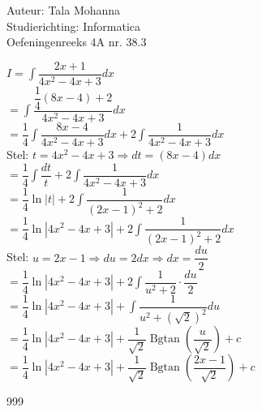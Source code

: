 \documentclass[a4paper]{article}
\newcommand{\adR}{\Rightarrow}
\newcommand{\Lh}{\left(}
\newcommand{\Rh}{\right)}
\newcommand{\intgrl}{\displaystyle\int}
\begin{document}
\noindent \large Auteur: Tala Mohanna \\
\noindent \large Studierichting: Informatica\\
\noindent \large Oefeningenreeks 4A nr. 38.3\\

\medskip

\normalsize

$ I = \intgrl \dfrac{2x+1}{4x^2-4x+3} dx$\\

$= \intgrl \dfrac{\dfrac{1}{4}\Lh 8x-4\Rh +2}{4x^2-4x+3} dx$\\

$= \dfrac{1}{4}\intgrl \dfrac{8x-4}{4x^2-4x+3} dx + 2\intgrl \dfrac{1}{4x^2-4x+3} dx$\\

Stel: $t = 4x^2-4x+3 \adR dt = \Lh 8x-4\Rh dx$\\

$= \dfrac{1}{4}\intgrl \dfrac{dt}{t} + 2\intgrl \dfrac{1}{4x^2-4x+3} dx$\\

$= \dfrac{1}{4}\ln |t| + 2\intgrl \dfrac{1}{\Lh 2x-1\Rh^2+2} dx$\\

$= \dfrac{1}{4}\ln |4x^2-4x+3| + 2\intgrl \dfrac{1}{\Lh 2x-1\Rh^2+2} dx$\\

Stel: $u = 2x-1 \adR du = 2dx \adR dx = \dfrac{du}{2}$\\

$= \dfrac{1}{4}\ln |4x^2-4x+3| + 2\intgrl \dfrac{1}{u^2+2}\cdot \dfrac{du}{2}$\\

$= \dfrac{1}{4}\ln |4x^2-4x+3| + \intgrl \dfrac{1}{u^2+\Lh \sqrt{2}\Rh^2}du$\\

$= \dfrac{1}{4}\ln |4x^2-4x+3| + \dfrac{1}{\sqrt{2}}\operatorname{Bgtan}\Lh \dfrac{u}{\sqrt{2}}\Rh + c$\\

$= \dfrac{1}{4}\ln |4x^2-4x+3| + \dfrac{1}{\sqrt{2}}\operatorname{Bgtan}\Lh \dfrac{2x-1}{\sqrt{2}}\Rh + c$\\


\begin{thebibliography}{999}
\end{thebibliography}
\end{document}
